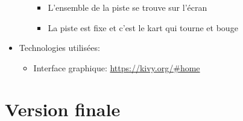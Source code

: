 \documentclass{article}
\begin{document}
\begin{itemize}
\begin{itemize}
\begin{itemize}
                        \item L'ensemble de la piste se trouve sur l'écran
                        \item La piste est fixe et c'est le kart qui tourne et bouge
                    \end{itemize}
          \end{itemize}
    \item Technologies utilisées: \begin{itemize}
              \item Interface graphique: \url{https://kivy.org/#home}
          \end{itemize}
\end{itemize}

\section{Version finale}
\end{document}
